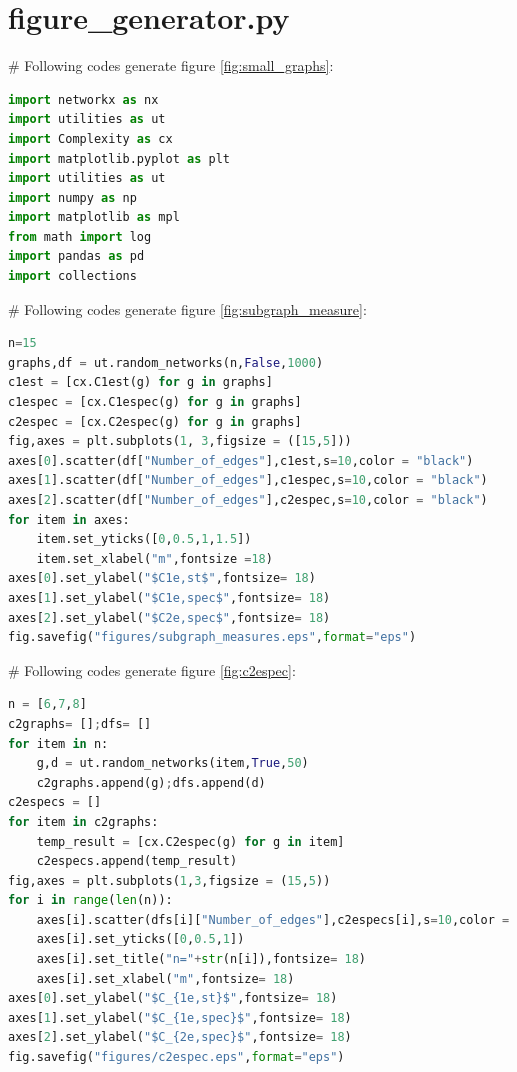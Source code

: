 \documentclass[12pt]{article}
\begin{document}
\section{figure\_generator.py}
\label{figure_generator}
\# Following codes generate figure \ref{fig:small_graphs}:
\begin{lstlisting}[breaklines=true,language=Python]
import networkx as nx
import utilities as ut
import Complexity as cx
import matplotlib.pyplot as plt
import utilities as ut
import numpy as np
import matplotlib as mpl
from math import log
import pandas as pd
import collections
\end{lstlisting}
\noindent
\newline
\# Following codes generate figure \ref{fig:subgraph_measure}:
\begin{lstlisting}[breaklines=true,language=Python]
n=15
graphs,df = ut.random_networks(n,False,1000)
c1est = [cx.C1est(g) for g in graphs]
c1espec = [cx.C1espec(g) for g in graphs]
c2espec = [cx.C2espec(g) for g in graphs]
fig,axes = plt.subplots(1, 3,figsize = ([15,5]))
axes[0].scatter(df["Number_of_edges"],c1est,s=10,color = "black")
axes[1].scatter(df["Number_of_edges"],c1espec,s=10,color = "black")
axes[2].scatter(df["Number_of_edges"],c2espec,s=10,color = "black")
for item in axes:
    item.set_yticks([0,0.5,1,1.5])
    item.set_xlabel("m",fontsize =18)
axes[0].set_ylabel("$C1e,st$",fontsize= 18)
axes[1].set_ylabel("$C1e,spec$",fontsize= 18)
axes[2].set_ylabel("$C2e,spec$",fontsize= 18)
fig.savefig("figures/subgraph_measures.eps",format="eps")
\end{lstlisting}
\noindent
\newline
\# Following codes generate figure \ref{fig:c2espec}:
\begin{lstlisting}[breaklines=true,language=Python]
n = [6,7,8]
c2graphs= [];dfs= []
for item in n:
    g,d = ut.random_networks(item,True,50)
    c2graphs.append(g);dfs.append(d)
c2especs = []
for item in c2graphs:
    temp_result = [cx.C2espec(g) for g in item]
    c2especs.append(temp_result)
fig,axes = plt.subplots(1,3,figsize = (15,5))
for i in range(len(n)):
    axes[i].scatter(dfs[i]["Number_of_edges"],c2especs[i],s=10,color = "black")
    axes[i].set_yticks([0,0.5,1])
    axes[i].set_title("n="+str(n[i]),fontsize= 18)
    axes[i].set_xlabel("m",fontsize= 18)
axes[0].set_ylabel("$C_{1e,st}$",fontsize= 18)
axes[1].set_ylabel("$C_{1e,spec}$",fontsize= 18)
axes[2].set_ylabel("$C_{2e,spec}$",fontsize= 18)
fig.savefig("figures/c2espec.eps",format="eps")
\end{lstlisting}
\end{document}
